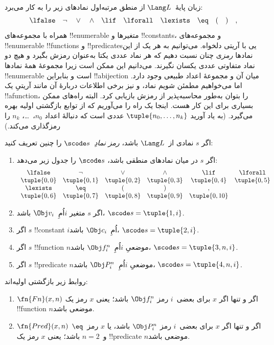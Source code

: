 \documentclass[../../../include/open-logic-section]{subfiles}
\begin{document}

زبان پایهٔ~$\Lang L$ از منطق مرتبه‌اول نمادهای زیر را به کار می‌برد:
\[
\lfalse \quad \lnot \quad \lor \quad \land \quad \lif \quad \lforall
\quad \lexists \quad \eq \quad ( \quad ) \quad ,
\]
همراه با مجموعه‌های !!{enumerable} متغیرها و !!{constant}s، و مجموعه‌های
!!{enumerable} !!{function}s و !!{predicate}sیی با آریتی دلخواه. می‌توانیم
به هر یک از این نمادها \emph{رمز}ی چنان نسبت دهیم که هر نماد عددی
یکتا به‌عنوان رمزش بگیرد و هیچ دو نماد متفاوتی عددی یکسان نگیرند.
می‌دانیم این ممکن است زیرا مجموعهٔ همهٔ نمادها !!{enumerable} است و
بنابراین !!a{bijection} میان آن و مجموعهٔ اعداد طبیعی وجود دارد.
اما می‌خواهیم مطمئن شویم نماد، و نیز برخی اطلاعات دربارهٔ آن مانند
آریتیِ یک !!a{function}، را بتوان به‌طور محاسبه‌پذیر از رمزش بازیابی کرد.
البته راه‌های ممکن بسیاری برای این کار هست. اینجا یک راه را می‌آوریم
که از توابع بازگشتی اولیه بهره می‌گیرد. (به یاد آورید
$\tuple{n_0,\dots,n_k}$ عددی است که دنبالهٔ اعداد
$n_0$،~\dots، $n_k$ را رمزگذاری می‌کند.)

\begin{defn}
اگر $s$ نمادی از~$\Lang L$ باشد، \emph{رمز نمادِ}~$\scode s$ را چنین
تعریف کنید:
\begin{enumerate}
\item اگر $s$ در میان نمادهای منطقی باشد، $\scode s$ را جدول زیر
  می‌دهد:
\[
\begin{array}{cccccccccc}
  \lfalse & \lnot & \lor & \land & \lif & \lforall \\
\tuple{0, 0} & \tuple{0, 1} & \tuple{0, 2} & \tuple{0, 3} &
\tuple{0, 4} & \tuple{0, 5} \\
\lexists & \eq & ( & ) & ,\\
\tuple{0, 6} & \tuple{0, 7} &
\tuple{0, 8} & \tuple{0, 9} & \tuple{0, 10}
\end{array}
\]
\item اگر $s$ متغیر $i$اُمِ~$\Obj v_i$ باشد،
$\scode s=\tuple{1,i}$.
\item اگر $s$ !!{constant} $i$اُمِ~$\Obj c_i$ باشد،
  $\scode s=\tuple{2,i}$.
\item اگر $s$ !!{function} $n$موضعیِ $i$اُمِ~$\Obj f_i^n$ باشد،
  $\scode s=\tuple{3,n,i}$.
\item اگر $s$ !!{predicate} $n$موضعیِ $i$اُمِ~$\Obj P_i^n$ باشد،
  $\scode s=\tuple{4,n,i}$.
\end{enumerate}
\end{defn}

\begin{prop}
روابط زیر بازگشتی اولیه‌اند:
\begin{enumerate}
\item $\fn{Fn}(x,n)$ اگر و تنها اگر $x$ برای بعضی~$i$ رمز
$\Obj f_i^n$ باشد؛ یعنی $x$ رمز یک !!{function} $n$موضعی باشد.
\item $\fn{Pred}(x,n)$ اگر و تنها اگر $x$ برای بعضی~$i$ رمز
$\Obj P_i^n$ باشد، یا $x$ رمز~$\eq$ و~$n=2$ باشد؛ یعنی $x$ رمز یک
!!{predicate} $n$موضعی باشد.
\end{enumerate}
\end{prop}
\end{document}
